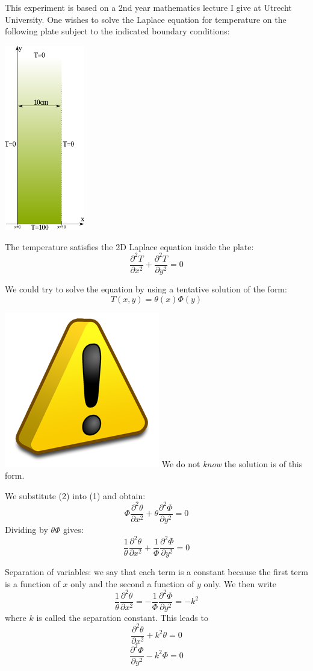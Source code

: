 This experiment is based on a 2nd year mathematics lecture I give at Utrecht University. 
One wishes to solve the Laplace equation for temperature on the following plate subject 
to the indicated boundary conditions:

\begin{center}
\includegraphics[width=3.5cm]{images/benchmark_lapplate/laplace2.png}
\end{center}


The temperature satisfies the 2D Laplace equation inside the plate:
\begin{equation}
\frac{\partial^2 T}{\partial x^2}
+ \frac{\partial^2 T}{\partial y^2} = 0
\end{equation}

We could try to solve the equation by using a tentative solution of the form:
\begin{equation}
T(x,y)=\theta(x) \Phi(y)
\end{equation}

\includegraphics[width=.5cm]{images/benchmark_lapplate/warning.png}
We do not {\it know} the solution is of this form.

We substitute (2) into (1) and obtain:
\[
\Phi \frac{\partial^2 \theta}{\partial x^2} +
\theta \frac{\partial^2 \Phi}{\partial y^2} = 0
\]
Dividing by $\theta\Phi$ gives:
\[
\frac{1}{\theta} \frac{\partial^2 \theta}{\partial x^2} +
\frac{1}{\Phi} \frac{\partial^2 \Phi}{\partial y^2} = 0
\]

Separation of variables: we say that each term is a constant because the first term is a function of $x$ only
and the second a function of $y$ only.
We then write
\[
\frac{1}{\theta} \frac{\partial^2 \theta}{\partial x^2} = - \frac{1}{\Phi} \frac{\partial^2 \Phi}{\partial y^2} = -k^2
\]
where $k$ is called the separation constant.
This leads to 
\[
\frac{\partial^2 \theta}{\partial x^2} + k^2 \theta = 0
\]
\[
\frac{\partial^2 \Phi}{\partial y^2} - k^2 \Phi =0
\]

